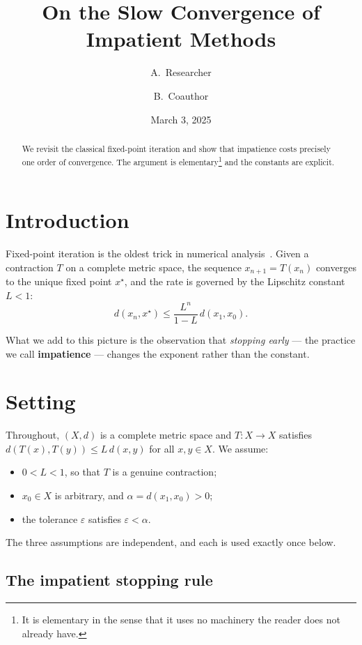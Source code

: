 \documentclass[11pt]{article}
\title{On the Slow Convergence of Impatient Methods}
\author{A.~Researcher \and B.~Coauthor}
\date{March 3, 2025}
\begin{document}
\maketitle

\begin{abstract}
  We revisit the classical fixed-point iteration and show that impatience costs
  precisely one order of convergence. The argument is elementary\footnote{It is
  elementary in the sense that it uses no machinery the reader does not already
  have.} and the constants are explicit.
\end{abstract}

\section{Introduction}
\label{sec:intro}

Fixed-point iteration is the oldest trick in numerical analysis~\cite{Ostrowski1966}.
Given a contraction $T$ on a complete metric space, the sequence $x_{n+1} = T(x_n)$
converges to the unique fixed point $x^\star$, and the rate is governed by the
Lipschitz constant $L < 1$:
\begin{equation}
  \label{eq:contraction}
  d(x_n, x^\star) \le \frac{L^n}{1 - L} \, d(x_1, x_0).
\end{equation}

What we add to this picture is the observation that \emph{stopping early} --- the
practice we call \textbf{impatience} --- changes the exponent rather than the
constant.

\section{Setting}

Throughout, $(X, d)$ is a complete metric space and $T \colon X \to X$ satisfies
$d(T(x), T(y)) \le L \, d(x,y)$ for all $x, y \in X$. We assume:
\begin{itemize}
  \item $0 < L < 1$, so that $T$ is a genuine contraction;
  \item $x_0 \in X$ is arbitrary, and $\alpha = d(x_1, x_0) > 0$;
  \item the tolerance $\varepsilon$ satisfies $\varepsilon < \alpha$.
\end{itemize}

The three assumptions are independent, and each is used exactly once below.

\subsection{The impatient stopping rule}
\end{document}
